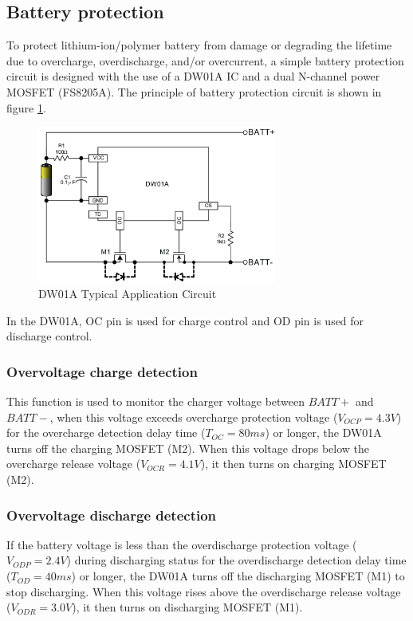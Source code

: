 \documentclass[\main/main.tex]{subfiles}
\begin{document}
\subsection{Battery protection}
To protect lithium-ion/polymer battery from damage or degrading the lifetime due to overcharge, overdischarge, and/or overcurrent, a simple battery protection circuit is designed with the use of a DW01A IC and a dual N-channel power MOSFET (FS8205A). The principle of battery protection circuit is shown in figure \ref{fig:dw01a_typical_use}.
\begin{figure}[H]
    \begin{center}
        \includegraphics[width=0.7\textwidth]{dw01a_typical_use.png}
    \end{center}
    \caption{DW01A Typical Application Circuit}
    \label{fig:dw01a_typical_use}
\end{figure}
In the DW01A, OC pin is used for charge control and OD pin is used for discharge control.
\subsubsection{Overvoltage charge detection}
This function is used to monitor the charger voltage between $BATT+$ and $BATT-$, when this voltage exceeds overcharge protection voltage ($V_{OCP} = 4.3V$) for the overcharge detection delay time ($T_{OC} = 80ms$) or longer,  the DW01A turns off the charging MOSFET (M2). When this voltage drops below the overcharge release voltage ($V_{OCR} = 4.1V$), it then turns on charging MOSFET (M2).

\subsubsection{Overvoltage discharge detection}
If the battery voltage is less than the overdischarge protection voltage ($V_{ODP} = 2.4V$) during discharging status for the overdischarge detection delay time ($T_{OD} = 40ms$) or longer, the DW01A turns off the discharging MOSFET (M1) to stop discharging. When this voltage rises above the overdischarge release voltage ($V_{ODR} = 3.0V$), it then turns on discharging MOSFET (M1).
\end{document}
